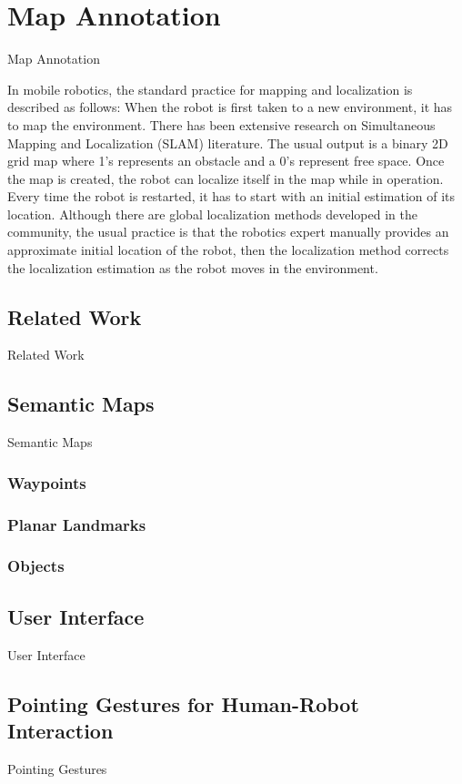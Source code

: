 \chapter{Map Annotation}
\label{chapter:map_annotation}

Map Annotation


In mobile robotics, the standard practice for mapping and
localization is described as follows: When the robot is first
taken to a new environment, it has to map the environment.
There has been extensive research on Simultaneous Mapping
and Localization (SLAM) literature. The usual output is a
binary 2D grid map where 1’s represents an obstacle and
a 0’s represent free space. Once the map is created, the
robot can localize itself in the map while in operation.
Every time the robot is restarted, it has to start with an
initial estimation of its location. Although there are global
localization methods developed in the community, the usual
practice is that the robotics expert manually provides an
approximate initial location of the robot, then the localization
method corrects the localization estimation as the robot
moves in the environment.
  
\section{Related Work}


Related Work

\section{Semantic Maps}

Semantic Maps

\subsection{Waypoints}

\subsection{Planar Landmarks}

\subsection{Objects}


\section{User Interface}

User Interface


\section{Pointing Gestures for Human-Robot Interaction}

Pointing Gestures